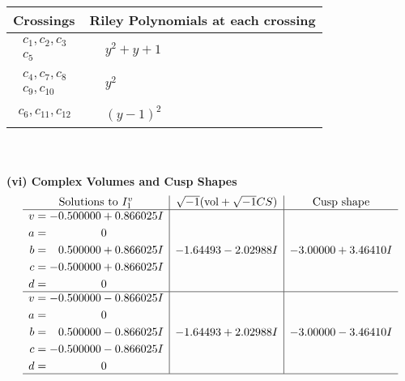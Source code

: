 \documentclass[1p]{elsarticle_modified}
\theoremstyle{definition}
\newcommand{\I}{\sqrt{-1}}
\begin{document}
\begin{tabular}{m{50pt}|m{274pt}}
Crossings & \hspace{64pt}Riley Polynomials at each crossing \\
\hline $$\begin{aligned}c_{1},c_{2},c_{3}\\c_{5}\end{aligned}$$&$\begin{aligned}
&y^2+y+1
\end{aligned}$\\
\hline $$\begin{aligned}c_{4},c_{7},c_{8}\\c_{9},c_{10}\end{aligned}$$&$\begin{aligned}
&y^2
\end{aligned}$\\
\hline $$\begin{aligned}c_{6},c_{11},c_{12}\end{aligned}$$&$\begin{aligned}
&(y-1)^2
\end{aligned}$\\
\hline
\end{tabular}\\~\\
\newpage\flushleft \textbf{(vi) Complex Volumes and Cusp Shapes}
$$\begin{array}{c|c|c}  
\text{Solutions to }I^v_{1}& \I (\text{vol} + \sqrt{-1}CS) & \text{Cusp shape}\\
 \hline 
\begin{aligned}
v &= -0.500000 + 0.866025 I \\
a &= \phantom{-0.000000 } 0 \\
b &= \phantom{-}0.500000 + 0.866025 I \\
c &= -0.500000 + 0.866025 I \\
d &= \phantom{-0.000000 } 0\end{aligned}
 & -1.64493 - 2.02988 I & -3.00000 + 3.46410 I \\ \hline\begin{aligned}
v &= -0.500000 - 0.866025 I \\
a &= \phantom{-0.000000 } 0 \\
b &= \phantom{-}0.500000 - 0.866025 I \\
c &= -0.500000 - 0.866025 I \\
d &= \phantom{-0.000000 } 0\end{aligned}
 & -1.64493 + 2.02988 I & -3.00000 - 3.46410 I\\
 \hline 
 \end{array}$$\newpage\newpage\renewcommand{\arraystretch}{1}
\end{document}

